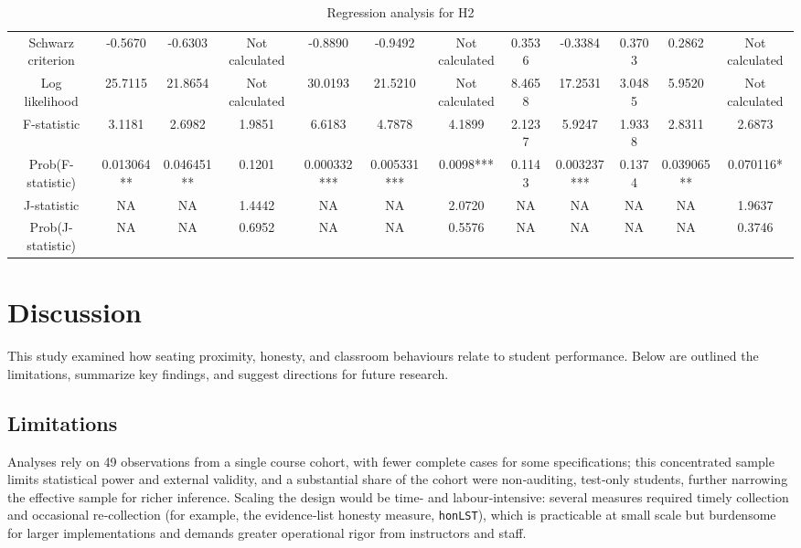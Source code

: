 \documentclass[]{article}
\begin{document}
\begin{landscape}
\begin{table}[htp]
\begin{adjustbox}{height=0.5\textheight,width=1.6\textwidth}
\begin{tabular}{c|ccc|ccc|cc|ccc}
				Schwarz criterion & -0.5670 & -0.6303 & Not calculated & -0.8890 & -0.9492 & Not calculated & 0.3536 & -0.3384 & 0.3703 & 0.2862 & Not calculated \\
				Log likelihood & 25.7115 & 21.8654 & Not calculated & 30.0193 & 21.5210 & Not calculated & 8.4658 & 17.2531 & 3.0485 & 5.9520 & Not calculated \\
				\hline
				F-statistic & 3.1181 & 2.6982 & 1.9851 & 6.6183 & 4.7878 & 4.1899 & 2.1237 & 5.9247 & 1.9338 & 2.8311 & 2.6873 \\
				Prob(F-statistic) & 0.013064** & 0.046451** & 0.1201 & 0.000332*** & 0.005331*** & 0.0098*** & 0.1143 & 0.003237*** & 0.1374 & 0.039065** & 0.070116* \\
				J-statistic & NA & NA & 1.4442 & NA & NA & 2.0720 & NA & NA & NA & NA & 1.9637 \\
				Prob(J-statistic) & NA & NA & 0.6952 & NA & NA & 0.5576 & NA & NA & NA & NA & 0.3746 \\
				\hline
			\end{tabular}
	
			
			\end{adjustbox}
			\caption{Regression analysis for H2}  
			\end{table} 
	\end{landscape}
	
\section{Discussion}

This study examined how seating proximity, honesty, and classroom behaviours relate to student performance. Below are outlined the limitations, summarize key findings, and suggest directions for future research.

\subsection{Limitations}

Analyses rely on 49 observations from a single course cohort, with fewer complete cases for some specifications; this concentrated sample limits statistical power and external validity, and a substantial share of the cohort were non‑auditing, test‑only students, further narrowing the effective sample for richer inference. Scaling the design would be time‑ and labour‑intensive: several measures required timely collection and occasional re‑collection (for example, the evidence‑list honesty measure, \texttt{honLST}), which is practicable at small scale but burdensome for larger implementations and demands greater operational rigor from instructors and staff.\\
\end{document}
